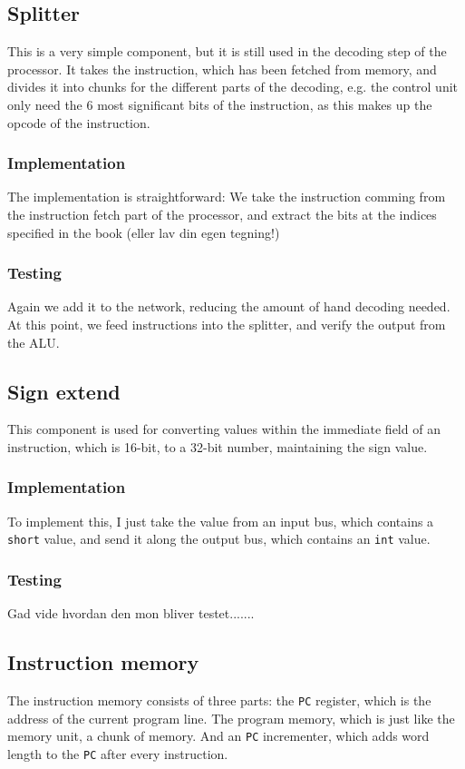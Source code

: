 \subsection{Splitter}
This is a very simple component, but it is still used in the decoding step of
the processor. It takes the instruction, which has been fetched from memory,
and divides it into chunks for the different parts of the decoding, e.g. the
control unit only need the 6 most significant bits of the instruction, as this
makes up the opcode of the instruction.

\subsubsection*{Implementation}
The implementation is straightforward: We take the instruction comming from the
instruction fetch part of the processor, and extract the bits at the indices
specified in the book (eller lav din egen tegning!)

\subsubsection*{Testing}
Again we add it to the network, reducing the amount of hand decoding needed. At
this point, we feed instructions into the splitter, and verify the output from
the ALU.

\subsection{Sign extend}
This component is used for converting values within the immediate field of an
instruction, which is 16-bit, to a 32-bit number, maintaining the sign value.

\subsubsection*{Implementation}
To implement this, I just take the value from an input bus, which contains a
\texttt{short} value, and send it along the output bus, which contains an
\texttt{int} value.

\subsubsection*{Testing}
Gad vide hvordan den mon bliver testet.......

\subsection{Instruction memory}
The instruction memory consists of three parts: the \texttt{PC} register, which
is the address of the current program line. The program memory, which is just
like the memory unit, a chunk of memory. And an \texttt{PC} incrementer, which
adds word length to the \texttt{PC} after every instruction.


